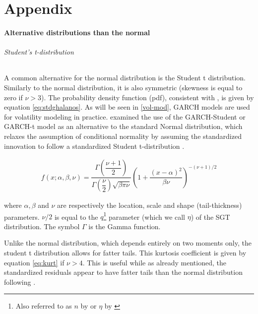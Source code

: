 \documentclass[a4paper, twoside]{templates/ociamthesis}
\begin{document}
\hypertarget{appendix}{%
\chapter{Appendix}\label{appendix}}

\hypertarget{conditional-distributions}{%
\subsubsection{Alternative distributions than the normal}\label{conditional-distributions}}

\hypertarget{students-t-distribution}{%
\subparagraph{Student's t-distribution}\label{students-t-distribution}}

\noindent A common alternative for the normal distribution is the Student t distribution. Similarly to the normal distribution, it is also symmetric (skewness is equal to zero if \(\nu > 3\)). The probability density function (pdf), consistent with \textcite{ghalanos2020}, is given by equation \eqref{eq:stdghalanos}. As will be seen in \ref{vol-mod}, GARCH models are used for volatility modeling in practice. \textcite{bollerslev1987} examined the use of the GARCH-Student or GARCH-t model as an alternative to the standard Normal distribution, which relaxes the assumption of conditional normality by assuming the standardized innovation to follow a standardized Student t-distribution \autocite{bollerslev2008}.

\begin{align}
f(x; \alpha, \beta,\nu) = \dfrac{\Gamma(\dfrac{\nu+1}{2})}{\Gamma(\dfrac{\nu}{2})\sqrt{\beta \pi \nu}} \left(1+\dfrac{(x-\alpha)^2}{\beta \nu}\right)^{-(\nu+1)/2}
 \label{eq:stdghalanos}
\end{align}

\noindent where \(\alpha, \beta\) and \(\nu\) are respectively the location, scale and shape (tail-thickness) parameters. \(\nu/2\) is equal to the \(q\)\footnote{Also referred to as \(n\) by \textcite{theodossiou1998} or \(\eta\) by \textcite{bali2008}} parameter (which we call \(\eta\)) of the SGT distribution. The symbol \(\Gamma\) is the Gamma function.

\noindent Unlike the normal distribution, which depends entirely on two moments only, the student t distribution allows for fatter tails. This kurtosis coefficient is given by equation \eqref{eq:kurt} if \(\nu>4\). This is useful while as already mentioned, the standardized residuals appear to have fatter tails than the normal distribution following \textcite{bollerslev2008}.
\end{document}
